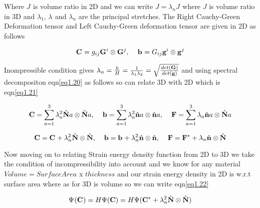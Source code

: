 \documentclass[12pt]{report}
\begin{document}
\begin{flushleft}
Where $\textit{J}^{}$ is volume ratio in 2D and we can write $\textit{J} = \lambda_{n}\textit{J}^{}$ where $\textit{J}$ is volume ratio in 3D and $\lambda_{1}$, $\lambda_{}$ and $\lambda_{n}$ are the principal stretches. The Right Cauchy-Green Deformation tensor and Left Cauchy-Green deformation tensor are given in 2D as follows

\begin{equation}\label{eq1.19}
    {\bf{C}}^{} = g_{ij}{\bf{G}}^{i}\otimes {\bf{G}}^{j},\hspace{4mm}{\bf{b}^{}} = G_{ij}{\bf{g}}^{i}\otimes {\bf{g}}^{j}
\end{equation}

Inompressible condition gives $\lambda_{n}=\frac{h}{H}=\frac{1}{\lambda_{1}\lambda_{2}}=\sqrt{\frac{det({\bf{G}})}{det({\bf{g}})}}$ and using spectral decompositon eqn\ref{eq1.20} as follows so can relate 3D with 2D which is eqn\ref{eq1.21}

\begin{equation}\label{eq1.20}
    {\bf{C}}=\sum_{a=1}^{3}\lambda_{a}^{2}\hat{\bf{N}}{a}\otimes\hat{\bf{N}}{a},\hspace{4mm}{\bf{b}}=\sum_{a=1}^{3}\lambda_{a}^{2}\hat{\bf{n}}{a}\otimes\hat{\bf{n}}{a},\hspace{4mm}{\bf{F}}=\sum_{a=1}^{3}\lambda_{a}\hat{\bf{n}}{a}\otimes\hat{\bf{N}}{a}
\end{equation}
    
\begin{equation}\label{eq1.21}
    {\bf{C}}={\bf{C}^{}}+\lambda_{n}^{2}\hat{\bf{N}}\otimes\hat{\bf{N}},\hspace{4mm}{\bf{b}}={\bf{b}^{}}+\lambda_{n}^{2}\hat{\bf{n}}\otimes\hat{\bf{n}},\hspace{4mm}{\bf{F}}={\bf{F}^{*}}+\lambda_{n}\hat{\bf{n}}\otimes\hat{\bf{N}}
\end{equation}
    
Now moving on to relating Strain energy density function from 2D to 3D we take the condition of incompressibility into account and we know for any material $Volume = Surface Area$ x $ thickness$ and our strain energy density in 2D is w.r.t surface area where as for 3D is volume so we can write eqn\ref{eq1.22}

\begin{equation}\label{eq1.22}
    \Psi^{}({\bf{C}^{}}) = H\Psi({\bf{C}}) = H\Psi({\bf{C}^{*}}+\lambda_{n}^{2}\hat{\bf{N}}\otimes\hat{\bf{N}})
\end{equation}

\end{flushleft}
\end{document}
